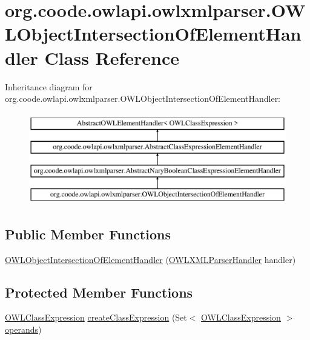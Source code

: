 \hypertarget{classorg_1_1coode_1_1owlapi_1_1owlxmlparser_1_1_o_w_l_object_intersection_of_element_handler}{\section{org.\-coode.\-owlapi.\-owlxmlparser.\-O\-W\-L\-Object\-Intersection\-Of\-Element\-Handler Class Reference}
\label{classorg_1_1coode_1_1owlapi_1_1owlxmlparser_1_1_o_w_l_object_intersection_of_element_handler}
}
Inheritance diagram for org.\-coode.\-owlapi.\-owlxmlparser.\-O\-W\-L\-Object\-Intersection\-Of\-Element\-Handler\-:\begin{figure}[H]
\begin{center}
\leavevmode
\includegraphics[height=4.000000cm]{classorg_1_1coode_1_1owlapi_1_1owlxmlparser_1_1_o_w_l_object_intersection_of_element_handler}
\end{center}
\end{figure}
\subsection*{Public Member Functions}
\begin{DoxyCompactItemize}
\item 
\hyperlink{classorg_1_1coode_1_1owlapi_1_1owlxmlparser_1_1_o_w_l_object_intersection_of_element_handler_a5347922a6679d1c518fb4fb7b10390b8}{O\-W\-L\-Object\-Intersection\-Of\-Element\-Handler} (\hyperlink{classorg_1_1coode_1_1owlapi_1_1owlxmlparser_1_1_o_w_l_x_m_l_parser_handler}{O\-W\-L\-X\-M\-L\-Parser\-Handler} handler)
\end{DoxyCompactItemize}
\subsection*{Protected Member Functions}
\begin{DoxyCompactItemize}
\item 
\hyperlink{interfaceorg_1_1semanticweb_1_1owlapi_1_1model_1_1_o_w_l_class_expression}{O\-W\-L\-Class\-Expression} \hyperlink{classorg_1_1coode_1_1owlapi_1_1owlxmlparser_1_1_o_w_l_object_intersection_of_element_handler_aadf2c1f5f28cfee3d7f61902f3f70f79}{create\-Class\-Expression} (Set$<$ \hyperlink{interfaceorg_1_1semanticweb_1_1owlapi_1_1model_1_1_o_w_l_class_expression}{O\-W\-L\-Class\-Expression} $>$ \hyperlink{classorg_1_1coode_1_1owlapi_1_1owlxmlparser_1_1_abstract_nary_boolean_class_expression_element_handler_a9d005ffcc6e7dac31391c38dd5e0e750}{operands})
\end{DoxyCompactItemize}



